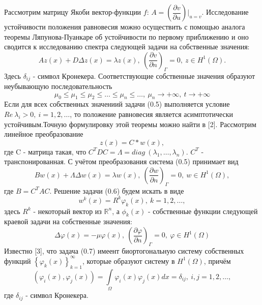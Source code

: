 \documentclass[9pt, a4paper]{extarticle}
\numberwithin{equation}{section}
\numberwithin{lemma}{section}
\numberwithin{definition}{section}
\numberwithin{notabene}{section}
\numberwithin{corollary}{section}
\begin{document}
	Рассмотрим матрицу Якоби вектор-функции $f$: $A = \left(\dfrac{\partial v}{\partial u}\right)\vert_{u=v}$.\newline
	Исследование устойчивости положения равновесия можно осуществить с помощью аналога теоремы Ляпунова-Пуанкаре об устойчивости по первому приближению и оно сводится к исследованию спектра следующей задачи на собственные значения:
	\begin{equation}
		Az(x) + D \Delta z(x) = \lambda z(x), \ \left(\dfrac{\partial v}{\partial n}\right)_\Gamma = 0, \ z \in H^1(\Omega).
	\end{equation}
	Здесь $\delta_{ij}$ - символ Кронекера.\newline
	Соответствующие собственные значения образуют неубывающую последовательность
	\begin{equation*}
		\mu_0 \leq \mu_1 \leq \mu_2 \leq \dots \leq \mu_n \leq \dots, \ \mu_n \to + \infty, \ t \to +\infty
	\end{equation*}
	Если для всех собственных значениий задачи (0.5) выполняется условие $Re\ \lambda_i > 0, \ i = 1, 2, \dots$, то положение равновесия является асимптотически устойчивым.Точную формулировку этой теоремы можно найти в [2]. Рассмотрим линейное преобразование
	\begin{equation*}
		z(x) = C * w(x),
	\end{equation*}
	где C - матрица такая, что $C^TDC = \Lambda = diag \ (\lambda_1, \dots, \lambda_n)$. $C^T$ - транспонированная.\newline
	С учётом преобразования система (0.5) принимает вид
	\begin{equation}
		Bw(x) + \Lambda \Delta w(x) = \lambda w(x), \ \left(\dfrac{\partial w}{\partial n}\right)_\Gamma = 0, \ w \in H^1(\Omega), 
	\end{equation}
	где $B = C^T A C$. Решение задачи (0.6) будем искать в виде
	\begin{equation}
		w^k(x) = R^k \varphi_k(x), \ k = 1, 2, \dots, 
	\end{equation}
	здесь $R^k$ - некоторый вектор из $\mathbb{R}^n$, а $\phi_k(x)$ - собственные функции следующей краевой задачи на собственные значения:
	\begin{equation}
		\Delta \varphi(x) = -\mu \varphi(x), \ \left(\dfrac{\partial \varphi}{\partial n}\right)_\Gamma = 0,   \ \varphi \in H^1(\Omega)
	\end{equation}
	Известно [3], что задача (0.7) имеент биортогональную систему собственных функций $\left\{ \varphi_k(x)\right\}_{k=1}^{\infty}$, которые образуют систему в $H^1(\Omega)$, причём
	\begin{equation}
		(\varphi_i(x), \varphi_j(x)) = \int\limits_\Omega \varphi_i(x) \varphi_j(x) dx = \delta_{ij}, \ i,j = 1, 2, \dots, 
	\end{equation}
	где $\delta_{ij}$ - символ Кронекера.\newline
		
\end{document}
